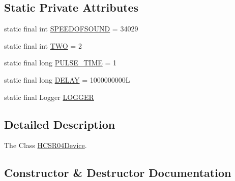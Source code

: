 \subsection*{Static Private Attributes}
\begin{DoxyCompactItemize}
\item 
static final int \hyperlink{classcom_1_1libsensorj_1_1concretesensor_1_1HCSR04Device_a1468a6c38c0086477a54eddbfe288299}{S\+P\+E\+E\+D\+O\+F\+S\+O\+U\+N\+D} = 34029
\item 
static final int \hyperlink{classcom_1_1libsensorj_1_1concretesensor_1_1HCSR04Device_a8f69accf3efa61a642b5e8693f7f158a}{T\+W\+O} = 2
\item 
static final long \hyperlink{classcom_1_1libsensorj_1_1concretesensor_1_1HCSR04Device_aaa527e39259b9e1be1b6360a397b3d30}{P\+U\+L\+S\+E\+\_\+\+T\+I\+M\+E} = 1
\item 
static final long \hyperlink{classcom_1_1libsensorj_1_1concretesensor_1_1HCSR04Device_a70071e4956bf93391031789b18039b6c}{D\+E\+L\+A\+Y} = 1000000000\+L
\item 
static final Logger \hyperlink{classcom_1_1libsensorj_1_1concretesensor_1_1HCSR04Device_a53449c0a7229928ddbb88c0d586cc63d}{L\+O\+G\+G\+E\+R}
\end{DoxyCompactItemize}


\subsection{Detailed Description}
The Class \hyperlink{classcom_1_1libsensorj_1_1concretesensor_1_1HCSR04Device}{H\+C\+S\+R04\+Device}. 

\subsection{Constructor \& Destructor Documentation}
\hypertarget{classcom_1_1libsensorj_1_1concretesensor_1_1HCSR04Device_ae0c7cdd02e374f360dff8d06a59b7c6d}{}
